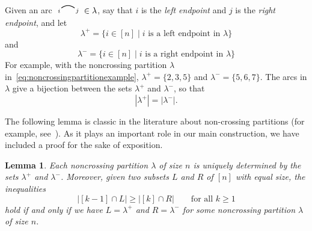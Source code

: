 \documentclass[12pt]{amsart}
\newtheorem{lem}[equation]{Lemma}
\theoremstyle{definition}
\theoremstyle{remark}
\numberwithin{equation}{section}
\newcommand{\edge}[2]{\tikz[scale = 0.75, baseline = -0.2cm]{
\draw (0.1, 0) node[inner sep = 0ex] (a) {};
\node[left, xshift = 0.1cm, yshift = -0.1cm] at (a) {$\scriptstyle #1$};
\draw (0.9, 0)  node[inner sep = 0ex] (b) {};
\node[right, xshift = -0.1cm, yshift = -0.1cm] at (b) {$\scriptstyle #2$};
\draw[thick] (a) to[out = 35, in = 145] (b);}}
\begin{document}
Given an arc $ \edge{i}{j} \in \lambda$, say that $i$ is the \emph{left endpoint} and $j$ is the \emph{right endpoint}, and let
\[
\lambda^{+} = \{ i \in [n] \;|\; \text{$i$ is a left endpoint in $\lambda$} \}
\]
and
\[
\lambda^{-} = \{ i \in [n] \;|\; \text{$i$ is a right endpoint in $\lambda$} \}
\]
For example, with the noncrossing partition $\lambda$ in~\eqref{eq:noncrossingpartitionexample}, $\lambda^{+} = \{2, 3, 5\}$ and $\lambda^{-} = \{5, 6, 7\}$.  The arcs in $\lambda$ give a bijection between the sets $\lambda^{+}$ and $\lambda^{-}$, so that
\[
|\lambda^{+}| = |\lambda^{-}|.
\]

The following lemma is classic in the literature about non-crossing partitions (for example, see~\cite{Stanley}). 
As it plays an important role in our main construction, we have included a proof for the sake of exposition.
\begin{lem}
\label{lem:noncrossingpartitionproperty}
Each noncrossing partition $\lambda$ of size $n$ is uniquely determined by the sets $\lambda^{+}$ and $\lambda^{-}$.  Moreover, given two subsets $L$ and $R$ of $[n]$ with equal size, the inequalities
\[
|[k-1] \cap L| \ge |[k] \cap R| \qquad\text{for all $k \ge 1$}
\]
hold if and only if we have $L = \lambda^{+}$ and $R = \lambda^{-}$ for some noncrossing partition $\lambda$ of size $n$.
\end{lem}
\end{document}
